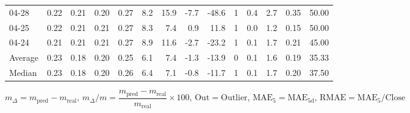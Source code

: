 \begin{threeparttable}
{\begin{tabular}{lrrrrrrrrrrrrr}
  04-28 &          0.22 &          0.21 &          0.20 &        0.27 &                 8.2 &                15.9 &       -7.7 &        -48.6 &              1 &                 0.4 &              2.7 &            0.35 &                  50.00 \\
  04-25 &          0.22 &          0.21 &          0.21 &        0.27 &                 8.3 &                 7.4 &        0.9 &         11.8 &              1 &                 0.0 &              1.2 &            0.15 &                  50.00 \\
  04-24 &          0.21 &          0.21 &          0.21 &        0.27 &                 8.9 &                11.6 &       -2.7 &        -23.2 &              1 &                 0.1 &              1.7 &            0.21 &                  45.00 \\
Average &          0.23 &          0.18 &          0.20 &        0.25 &                 6.1 &                 7.4 &       -1.3 &        -13.9 &              0 &                 0.1 &              1.6 &            0.19 &                  35.33 \\
 Median &          0.23 &          0.18 &          0.20 &        0.26 &                 6.4 &                 7.1 &       -0.8 &        -11.7 &              1 &                 0.1 &              1.7 &            0.20 &                  37.50 \\
\bottomrule
\end{tabular}
}
\begin{tablenotes}\footnotesize
\item $m_\Delta=m_{\text{pred}}-m_{\text{real}}$,
$m_\Delta/m=\dfrac{m_{\text{pred}}-m_{\text{real}}}{m_{\text{real}}}\times100$,
$\mathrm{Out}=\text{Outlier}$,
$\mathrm{MAE}_5=\mathrm{MAE}_{5\text{d}}$,
$\mathrm{RMAE}=\mathrm{MAE}_5/\text{Close}$
\end{tablenotes}
\end{threeparttable}
\endgroup


